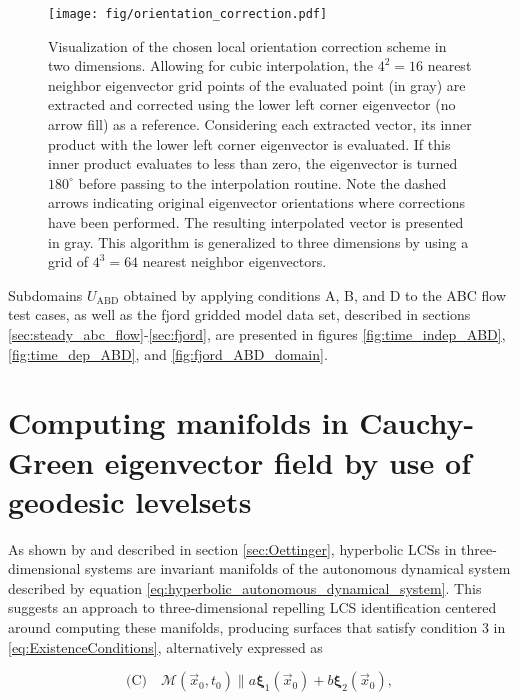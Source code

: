 \begin{figure}[h!] 
\centering
\texttt{[image: fig/orientation\_correction.pdf]}
\caption{Visualization of the chosen local orientation correction scheme in two dimensions. Allowing for cubic interpolation, the $4^2=16$ nearest neighbor eigenvector grid points of the evaluated point (in gray) are extracted and corrected using the lower left corner eigenvector (no arrow fill) as a reference. Considering each extracted vector, its inner product with the lower left corner eigenvector is evaluated. If this inner product evaluates to less than zero, the eigenvector is turned $180^{\circ}$ before passing to the interpolation routine. Note the dashed arrows indicating original eigenvector orientations where corrections have been performed. The resulting interpolated vector is presented in gray. This algorithm is generalized to three dimensions by using a grid of $4^3=64$ nearest neighbor eigenvectors.}\label{fig:local_orientation_correction}
\end{figure}

Subdomains $U_{\text{ABD}}$ obtained by applying conditions A, B, and D to the ABC flow test cases, as well as the fjord gridded model data set, described in sections \ref{sec:steady_abc_flow}-\ref{sec:fjord}, are presented in figures \ref{fig:time_indep_ABD}, \ref{fig:time_dep_ABD}, and \ref{fig:fjord_ABD_domain}.

\section{Computing manifolds in Cauchy-Green eigenvector field by use of geodesic levelsets}\label{sec:GLS_intro}

As shown by \cite{Oettinger} and described in section \ref{sec:Oettinger}, hyperbolic LCSs in three-dimensional systems are invariant manifolds of the autonomous dynamical system described by equation \eqref{eq:hyperbolic_autonomous_dynamical_system}. This suggests an approach to three-dimensional repelling LCS identification centered around computing these manifolds, producing surfaces that satisfy condition 3 in \eqref{eq:ExistenceConditions}, alternatively expressed as

\begin{equation}\label{eq:LCS_condition_C}
	\text{(C)} \quad \mathcal{M}(\vec{x}_0,t_0) \parallel a\bm{\xi}_1(\vec{x}_0) + b\bm{\xi}_2(\vec{x}_0),
\end{equation}


